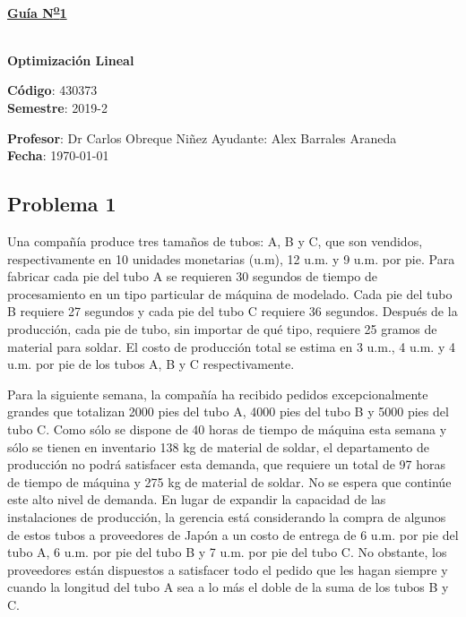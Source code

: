 \documentclass[letterpaper]{article}
\begin{document}
\vspace*{0.5\baselineskip}
\begin{center}
\begin{Large}
\textbf{\underline{Guía N\textsuperscript{\underline{o}}1}}
\end{Large}\\
\vspace*{0.5\baselineskip}
\textbf{Optimización Lineal} \\
\vspace*{0.5\baselineskip}
\begin{footnotesize}
\textbf{Código}: 430373\\
\textbf{Semestre}: 2019-2
\end{footnotesize}
\end{center}

\noindent \textbf{Profesor}: Dr Carlos Obreque Niñez  \hfill Ayudante: Alex Barrales Araneda\\
\noindent \textbf{Fecha}: \today

\subsection*{Problema 1}
Una compañía produce tres tamaños de tubos: A, B y C, que son vendidos, respectivamente en 10 unidades monetarias (u.m), 12 u.m. y 9 u.m. por pie. Para fabricar cada pie del tubo A se requieren 30 segundos de tiempo de procesamiento en un tipo particular de máquina de modelado. Cada pie del tubo B requiere 27 segundos y cada pie del tubo C requiere 36 segundos. Después de la producción, cada pie de tubo, sin importar de qué tipo, requiere 25 gramos de material para soldar. El costo de producción total se estima en 3 u.m., 4 u.m. y 4 u.m. por pie de los tubos A, B y C respectivamente.

Para la siguiente semana, la compañía ha recibido pedidos excepcionalmente grandes que totalizan 2000 pies del tubo A, 4000 pies del tubo B y 5000 pies del tubo C. Como sólo se dispone de 40 horas de tiempo de máquina esta semana y sólo se tienen en inventario 138 kg de material de soldar, el departamento de producción no podrá satisfacer esta demanda, que requiere un total de 97 horas de tiempo de máquina y 275 kg de material de soldar. No se espera que continúe este alto nivel de demanda. En lugar de expandir la capacidad de las instalaciones de producción, la gerencia está considerando la compra de algunos de estos tubos a proveedores de Japón a un costo de entrega de 6 u.m. por pie del tubo A, 6 u.m. por pie del tubo B y 7 u.m. por pie del tubo C. No obstante, los proveedores están dispuestos a satisfacer todo el pedido que les hagan siempre y cuando la longitud del tubo A sea a lo más el doble de la suma de los tubos B y C.
\end{document}
